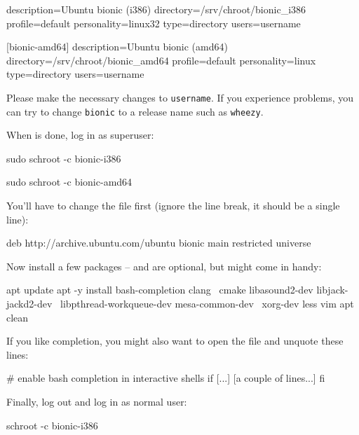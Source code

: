 \begin{VerbatimBoth}
  [bionic-i386]
  description=Ubuntu bionic (i386)
  directory=/srv/chroot/bionic_i386
  profile=default
  personality=linux32
  type=directory
  users=username

  [bionic-amd64]
  description=Ubuntu bionic (amd64)
  directory=/srv/chroot/bionic_amd64
  profile=default
  personality=linux
  type=directory
  users=username
\end{VerbatimBoth}

Please make the necessary changes to \texttt{username}.  If you
experience problems, you can try to change \texttt{bionic} to a
release name such as \texttt{wheezy}.

When  is done, log in as superuser:

\begin{Verbatim32}
  sudo schroot -c bionic-i386
\end{Verbatim32}

\begin{Verbatim64}
  sudo schroot -c bionic-amd64
\end{Verbatim64}

You'll have to change the file  first
(ignore the line break, it should be a single line):

\begin{VerbatimBoth}
  deb http://archive.ubuntu.com/ubuntu bionic
  main restricted universe
\end{VerbatimBoth}

Now install a few packages --  and  are optional,
but might come in handy:

\begin{VerbatimBoth}
  apt update
  apt -y install bash-completion clang \
    cmake libasound2-dev libjack-jackd2-dev \
    libpthread-workqueue-dev mesa-common-dev \
    xorg-dev less vim
  apt clean
\end{VerbatimBoth}

If you like  completion, you might also want to open the
file  and unquote these lines:

\begin{VerbatimBoth}
  # enable bash completion in interactive shells
  if [...]
    [a couple of lines...]
  fi
\end{VerbatimBoth}

Finally, log out and log in as normal user:

\begin{Verbatim32}
  schroot -c bionic-i386
\end{Verbatim32}

